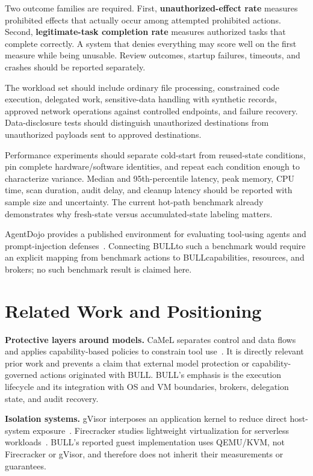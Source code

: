 \documentclass[journal]{IEEEtran}
\newcommand{\bull}{\textsc{BULL}}
\begin{document}
Two outcome families are required. First, \textbf{unauthorized-effect rate} measures prohibited effects that actually occur among attempted prohibited actions. Second, \textbf{legitimate-task completion rate} measures authorized tasks that complete correctly. A system that denies everything may score well on the first measure while being unusable. Review outcomes, startup failures, timeouts, and crashes should be reported separately.

The workload set should include ordinary file processing, constrained code execution, delegated work, sensitive-data handling with synthetic records, approved network operations against controlled endpoints, and failure recovery. Data-disclosure tests should distinguish unauthorized destinations from unauthorized payloads sent to approved destinations.

Performance experiments should separate cold-start from reused-state conditions, pin complete hardware/software identities, and repeat each condition enough to characterize variance. Median and 95th-percentile latency, peak memory, CPU time, scan duration, audit delay, and cleanup latency should be reported with sample size and uncertainty. The current hot-path benchmark already demonstrates why fresh-state versus accumulated-state labeling matters.

AgentDojo provides a published environment for evaluating tool-using agents and prompt-injection defenses~\cite{Debenedetti2024}. Connecting \bull to such a benchmark would require an explicit mapping from benchmark actions to \bull capabilities, resources, and brokers; no such benchmark result is claimed here.

\section{Related Work and Positioning}
\textbf{Protective layers around models.} CaMeL separates control and data flows and applies capability-based policies to constrain tool use~\cite{Debenedetti2025}. It is directly relevant prior work and prevents a claim that external model protection or capability-governed actions originated with \bull. \bull's emphasis is the execution lifecycle and its integration with OS and VM boundaries, brokers, delegation state, and audit recovery.

\textbf{Isolation systems.} gVisor interposes an application kernel to reduce direct host-system exposure~\cite{gVisor}. Firecracker studies lightweight virtualization for serverless workloads~\cite{Agache2020}. \bull's reported guest implementation uses QEMU/KVM, not Firecracker or gVisor, and therefore does not inherit their measurements or guarantees.
\end{document}
